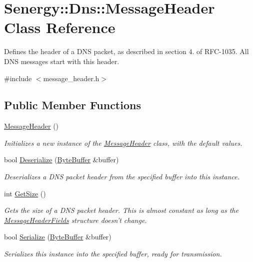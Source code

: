 \hypertarget{class_senergy_1_1_dns_1_1_message_header}{\section{Senergy\-:\-:Dns\-:\-:Message\-Header Class Reference}
\label{class_senergy_1_1_dns_1_1_message_header}
}


Defines the header of a D\-N\-S packet, as described in section 4. of R\-F\-C-\/1035. All D\-N\-S messages start with this header.  




{\ttfamily \#include $<$message\-\_\-header.\-h$>$}

\subsection*{Public Member Functions}
\begin{DoxyCompactItemize}
\item 
\hyperlink{class_senergy_1_1_dns_1_1_message_header_aa103a12edc759b885f57728c091a84eb}{Message\-Header} ()
\begin{DoxyCompactList}\small\item\em Initializes a new instance of the \hyperlink{class_senergy_1_1_dns_1_1_message_header}{Message\-Header} class, with the default values. \end{DoxyCompactList}\item 
bool \hyperlink{class_senergy_1_1_dns_1_1_message_header_aa54f3864838fe22a4406e0c52a90a010}{Deserialize} (\hyperlink{class_senergy_1_1_byte_buffer}{Byte\-Buffer} \&buffer)
\begin{DoxyCompactList}\small\item\em Deserializes a D\-N\-S packet header from the specified buffer into this instance. \end{DoxyCompactList}\item 
int \hyperlink{class_senergy_1_1_dns_1_1_message_header_a69f4475bc3153926dbb011f37cbbfea9}{Get\-Size} ()
\begin{DoxyCompactList}\small\item\em Gets the size of a D\-N\-S packet header. This is almost constant as long as the \hyperlink{struct_senergy_1_1_dns_1_1_message_header_fields}{Message\-Header\-Fields} structure doesn't change. \end{DoxyCompactList}\item 
bool \hyperlink{class_senergy_1_1_dns_1_1_message_header_ab443595ff8e11a828022f0cc5f3f6fbe}{Serialize} (\hyperlink{class_senergy_1_1_byte_buffer}{Byte\-Buffer} \&buffer)
\begin{DoxyCompactList}\small\item\em Serializes this instance into the specified buffer, ready for transmission. \end{DoxyCompactList}\end{DoxyCompactItemize}
